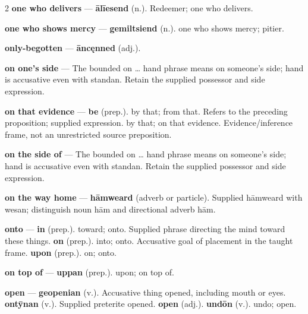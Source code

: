 \begin{multicols}{2}
\textbf{one who delivers} — \textbf{ālīesend} (n.). Redeemer; one who delivers.\par
\textbf{one who shows mercy} — \textbf{gemiltsiend} (n.). one who shows mercy; pitier.\par
\textbf{only-begotten} — \textbf{āncęnned} (adj.).\par
\textbf{on one's side} — The bounded on … hand phrase means on someone’s side; hand is accusative even with standan. Retain the supplied possessor and side expression.\par
\textbf{on that evidence} — \textbf{be} (prep.). by that; from that. Refers to the preceding proposition; supplied expression. by that; on that evidence. Evidence/inference frame, not an unrestricted source preposition.\par
\textbf{on the side of} — The bounded on … hand phrase means on someone’s side; hand is accusative even with standan. Retain the supplied possessor and side expression.\par
\textbf{on the way home} — \textbf{hāmweard} (adverb or particle). Supplied hāmweard with wesan; distinguish noun hām and directional adverb hām.\par
\textbf{onto} — \textbf{in} (prep.). toward; onto. Supplied phrase directing the mind toward these things. \textbf{on} (prep.). into; onto. Accusative goal of placement in the taught frame. \textbf{upon} (prep.). on; onto.\par
\textbf{on top of} — \textbf{uppan} (prep.). upon; on top of.\par
\textbf{open} — \textbf{geopenian} (v.). Accusative thing opened, including mouth or eyes. \textbf{ontȳnan} (v.). Supplied preterite opened. \textbf{open} (adj.).  \textbf{undōn} (v.). undo; open.\par

\end{multicols}
